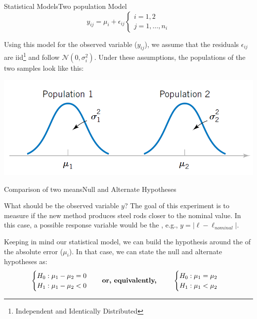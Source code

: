 \begin{frame}{Statistical Models}{Two population Model}
  \begin{equation*}
    y_{ij} = \mu_i + \epsilon_{ij}\begin{cases}i=1,2\\j=1,\ldots,n_i\end{cases}
  \end{equation*}\medskip

  Using this model for the observed variable ($y_{ij}$), we assume that the residuals $\epsilon_{ij}$ are iid\footnote{Independent and Identically Distributed} and follow $\mathcal{N}\left(0,\sigma_i^2\right)$. Under these assumptions, the populations of the two samples look like this:

  \begin{center}
    \includegraphics[width=.6\textwidth]{../img/two_population_model}
  \end{center}
\end{frame}

\begin{frame}{Comparison of two means}{Null and Alternate Hypotheses}

What should be the observed variable $y$? The goal of this experiment is to measure if the new method produces steel rods closer to the nominal value. In this case, a possible response variable would be the , e.g., $y = |\ell - \ell_{nominal}|$.\bigskip

Keeping in mind our statistical model, we can build the hypothesis around the  of the absolute error ($\mu_i$). In that case, we can state the null and alternate hypotheses as:
\begin{equation*}
\begin{cases}
H_0: \mu_1 - \mu_2 = 0\\
H_1: \mu_1 - \mu_2 < 0
\end{cases}\ \ \ \mbox{\textbf{or, equivalently, }}\ \ \ \ \ \ \begin{cases}
H_0: \mu_1 = \mu_2\\
H_1: \mu_1 < \mu_2
\end{cases}
\end{equation*}
\medskip
\end{frame}



